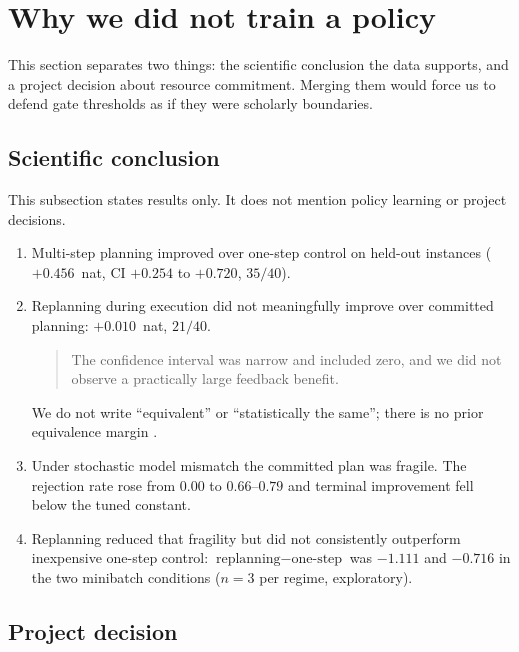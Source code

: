 \section{Why we did not train a policy}
\label{sec:nopolicy}

This section separates two things: the scientific conclusion the data supports, and
a project decision about resource commitment. Merging them would force us to defend
gate thresholds as if they were scholarly boundaries.

\subsection{Scientific conclusion}
\label{sec:scientific-conclusion}

This subsection states results only. It does not mention policy learning or project
decisions.

\begin{enumerate}
  \item Multi-step planning improved over one-step control on held-out instances
        ($+0.456$~nat, CI $+0.254$ to $+0.720$, $35/40$).
  \item Replanning during execution did not meaningfully improve over committed
        planning: $+0.010$~nat, $21/40$.

        \begin{quote}
        The confidence interval was narrow and included zero, and we did not
        observe a practically large feedback benefit.
        \end{quote}

        We do not write ``equivalent'' or ``statistically the same''; there is no
        prior equivalence margin
        \citep{schuirmann1987tost,lakens2017equivalence}.
  \item Under stochastic model mismatch the committed plan was fragile. The
        rejection rate rose from $0.00$ to $0.66$--$0.79$ and terminal improvement
        fell below the tuned constant.
  \item Replanning reduced that fragility but did not consistently outperform
        inexpensive one-step control: $\text{replanning} - \text{one-step}$ was
        $-1.111$ and $-0.716$ in the two minibatch conditions
        ($n = 3$ per regime, exploratory).
\end{enumerate}

\subsection{Project decision}

